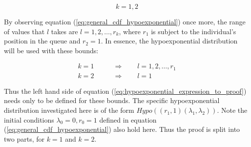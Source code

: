 \begin{equation*}
    k = 1, 2
\end{equation*}

By observing equation (\ref{eq:general_cdf_hypoexponential}) once more, the range
of values that \(l\) takes are \(l = 1, 2, \dots, r_k\), where \(r_1\) is 
subject to the individual's position in the queue and \(r_2 = 1\).
In essence, the hypoexponential distribution will be used with these bounds:

\begin{align}
    k = 1 & \qquad \Rightarrow \qquad l = 1, 2, \dots, r_1 \nonumber \\
    k = 2 & \qquad \Rightarrow \qquad l = 1
\end{align}

Thus the left hand side of equation (\ref{eq:hypoexponential_expression_to_proof}) 
needs only to be defined for these bounds. 
The specific hypoexponential distribution investigated here is of the form
\(Hypo((r_1, 1)(\lambda_1, \lambda_2))\).
Note the initial conditions \(\lambda_0=0, r_0=1\) defined in equation 
(\ref{eq:general_cdf_hypoexponential}) also hold here.
Thus the proof is split into two parts, for \(k=1\) and \(k=2\).



